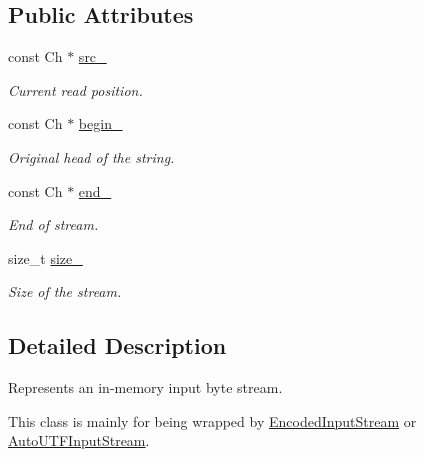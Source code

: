 \subsection*{Public Attributes}
\begin{DoxyCompactItemize}
\item 
const Ch $\ast$ \hyperlink{a00224_a57cf6cb5766e931a62928b9f92507443}{src\+\_\+}\hypertarget{a00224_a57cf6cb5766e931a62928b9f92507443}{}\label{a00224_a57cf6cb5766e931a62928b9f92507443}

\begin{DoxyCompactList}\small\item\em Current read position. \end{DoxyCompactList}\item 
const Ch $\ast$ \hyperlink{a00224_a91f0767b4f0ed2476d835e8344848a2f}{begin\+\_\+}\hypertarget{a00224_a91f0767b4f0ed2476d835e8344848a2f}{}\label{a00224_a91f0767b4f0ed2476d835e8344848a2f}

\begin{DoxyCompactList}\small\item\em Original head of the string. \end{DoxyCompactList}\item 
const Ch $\ast$ \hyperlink{a00224_a55fb302ba0492419757e3ba318c8c654}{end\+\_\+}\hypertarget{a00224_a55fb302ba0492419757e3ba318c8c654}{}\label{a00224_a55fb302ba0492419757e3ba318c8c654}

\begin{DoxyCompactList}\small\item\em End of stream. \end{DoxyCompactList}\item 
size\+\_\+t \hyperlink{a00224_ab26a1b5c6d5e8f52c0f6982feba47f36}{size\+\_\+}\hypertarget{a00224_ab26a1b5c6d5e8f52c0f6982feba47f36}{}\label{a00224_ab26a1b5c6d5e8f52c0f6982feba47f36}

\begin{DoxyCompactList}\small\item\em Size of the stream. \end{DoxyCompactList}\end{DoxyCompactItemize}


\subsection{Detailed Description}
Represents an in-\/memory input byte stream. 

This class is mainly for being wrapped by \hyperlink{a00092}{Encoded\+Input\+Stream} or \hyperlink{a00041}{Auto\+U\+T\+F\+Input\+Stream}.

